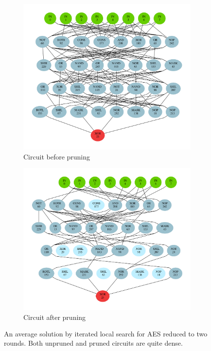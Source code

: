 \documentclass[
  print, %
  Table,   %
  nolof,     %
  nolot,     %
  11pt, %
  oneside  %
]{fithesis3}
\begin{document}
\begin{figure}
\begin{changemargin}{-3cm}{-3cm}
\centering
\begin{subfigure}{.6\textwidth}
  \centering
  \includegraphics[width=\textwidth]{./graphics/ils/circuit}
  \caption{Circuit before pruning}
  \label{fig:ils-circuit-unpruned}
\end{subfigure}%
\begin{subfigure}{.6\textwidth}
  \centering
  \includegraphics[width=\textwidth]{./graphics/ils/pruned}
  \caption{Circuit after pruning}
  \label{fig:ils-circuit-pruned}
\end{subfigure}
\end{changemargin}
\caption{An average solution by iterated local search for AES reduced to two rounds. Both unpruned and pruned circuits are quite dense.}
\label{fig:ils-circuits}
\end{figure}
\end{document}
